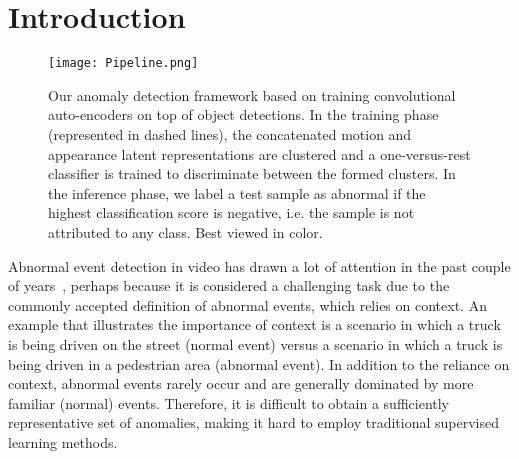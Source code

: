 \documentclass[10pt,twocolumn,letterpaper]{article}
\begin{document}
\vspace*{-0.4cm}
\section{Introduction}
\vspace*{-0.1cm}

\begin{figure*}[!t]

\begin{center}
\texttt{[image: Pipeline.png]}
\end{center}
\vspace*{-0.45cm}
\caption{Our anomaly detection framework based on training convolutional auto-encoders on top of object detections. In the training phase (represented in dashed lines), the concatenated motion and appearance latent representations are clustered and a one-versus-rest classifier is trained to discriminate between the formed clusters. In the inference phase, we label a test sample as abnormal if the highest classification score is negative, i.e. the sample is not attributed to any class. Best viewed in color.}
\label{fig_pipeline}
\vspace*{-0.42cm}
\end{figure*}

Abnormal event detection in video has drawn a lot of attention in the past couple of years~\cite{Giorno-ECCV-2016,Hasan-CVPR-2016,Hinami-ICCV-2017,Ionescu-ICCV-2017,Ionescu-WACV-2019,Liu-CVPR-2018,Liu-BMVC-2018,Luo-ICCV-2017,Ravanbakhsh-WACV-2018,Ravanbakhsh-ICIP-2017,Sabokrou-IP-2017,Smeureanu-ICIAP-2017,Sultani-CVPR-2018,Xu-BMVC-2015,Xu-CVIU-2017,Zhang-PR-2016}, perhaps because it is considered a challenging task due to the commonly accepted definition of abnormal events, which relies on context. An example that illustrates the importance of context is a scenario in which a truck is being driven on the street (normal event) versus a scenario in which a truck is being driven in a pedestrian area (abnormal event). In addition to the reliance on context, abnormal events rarely occur and are generally dominated by more familiar (normal) events.
Therefore, it is difficult to obtain a sufficiently representative set of anomalies, making it hard to employ traditional supervised learning methods.
\end{document}
